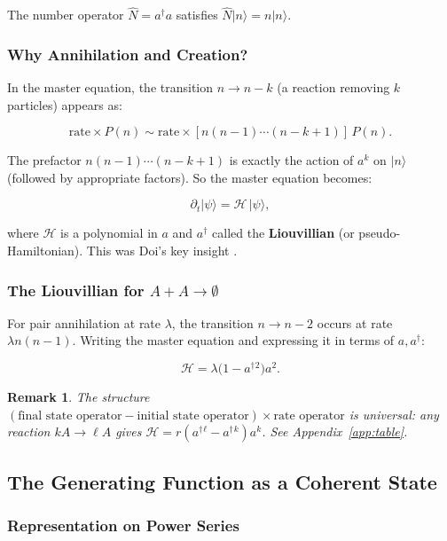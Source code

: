 \documentclass[11pt,a4paper]{article}
\newtheorem*{remark}{Remark}
\theoremstyle{definition}
\newcommand{\ad}{a^\dagger}
\newcommand{\Hcal}{\mathcal{H}}
\begin{document}
The number operator $\hat{N} = \ad a$ satisfies $\hat{N}|n\rangle = n|n\rangle$.

\subsubsection{Why Annihilation and Creation?}

In the master equation, the transition $n \to n-k$ (a reaction removing $k$
particles) appears as:

\[
  \text{rate} \times P(n) \sim \text{rate} \times [n(n-1)\cdots(n-k+1)]\, P(n).
\]

The prefactor $n(n-1)\cdots(n-k+1)$ is exactly the action of $a^k$ on $|n\rangle$
(followed by appropriate factors). So the master equation becomes:

\begin{equation}
  \partial_t |\psi\rangle = \Hcal\,|\psi\rangle,
  \label{eq:doit_master}
\end{equation}

where $\Hcal$ is a polynomial in $a$ and $\ad$ called the \textbf{Liouvillian}
(or pseudo-Hamiltonian). This was Doi's key insight \cite{doi1976a, doi1976b}.

\subsubsection{The Liouvillian for $A + A \to \emptyset$}

For pair annihilation at rate $\lambda$, the transition $n \to n-2$ occurs at rate
$\lambda n(n-1)$. Writing the master equation and expressing it in terms of $a, \ad$:

\begin{equation}
  \Hcal = \lambda\bigl(1 - \ad{}^2\bigr)a^2.
  \label{eq:liouvillian_aa}
\end{equation}

\begin{remark}
The structure $(\text{final state operator} - \text{initial state operator})
\times \text{rate operator}$ is universal: any reaction $kA \to \ell A$ gives
$\Hcal = r(\ad{}^\ell - \ad{}^k)a^k$. See Appendix~\ref{app:table}.
\end{remark}

\subsection{The Generating Function as a Coherent State}

\subsubsection{Representation on Power Series}
\end{document}
